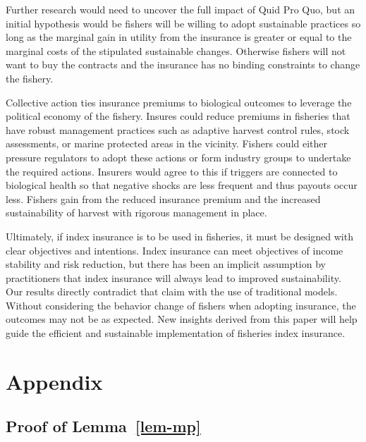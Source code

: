 \documentclass[
  letterpaper,
  DIV=11,
  numbers=noendperiod]{scrartcl}
\theoremstyle{plain}
\theoremstyle{plain}
\theoremstyle{remark}
\begin{document}
Further research would need to uncover the full impact of Quid Pro Quo,
but an initial hypothesis would be fishers will be willing to adopt
sustainable practices so long as the marginal gain in utility from the
insurance is greater or equal to the marginal costs of the stipulated
sustainable changes. Otherwise fishers will not want to buy the
contracts and the insurance has no binding constraints to change the
fishery.

Collective action ties insurance premiums to biological outcomes to
leverage the political economy of the fishery. Insures could reduce
premiums in fisheries that have robust management practices such as
adaptive harvest control rules, stock assessments, or marine protected
areas in the vicinity. Fishers could either pressure regulators to adopt
these actions or form industry groups to undertake the required actions.
Insurers would agree to this if triggers are connected to biological
health so that negative shocks are less frequent and thus payouts occur
less. Fishers gain from the reduced insurance premium and the increased
sustainability of harvest with rigorous management in place.

Ultimately, if index insurance is to be used in fisheries, it must be
designed with clear objectives and intentions. Index insurance can meet
objectives of income stability and risk reduction, but there has been an
implicit assumption by practitioners that index insurance will always
lead to improved sustainability. Our results directly contradict that
claim with the use of traditional models. Without considering the
behavior change of fishers when adopting insurance, the outcomes may not
be as expected. New insights derived from this paper will help guide the
efficient and sustainable implementation of fisheries index insurance.

\newpage
\appendix
\renewcommand{\thefigure}{A\arabic{figure}}
\renewcommand{\thetable}{A\arabic{table}}
\setcounter{figure}{0}
\setcounter{table}{0}

\section{Appendix}\label{appendix}

\subsection{\texorpdfstring{Proof of
Lemma~\ref{lem-mp}}{Proof of Lemma~}}\label{proof-of-lem-mp}
\end{document}

